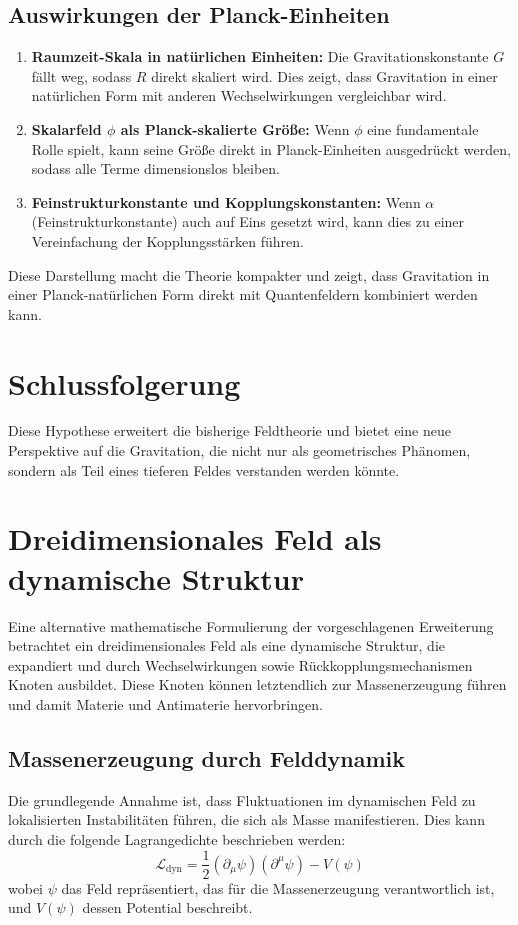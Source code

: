 \documentclass[a4paper,11pt]{article}
\begin{document}
	\subsection{Auswirkungen der Planck-Einheiten}
	\begin{enumerate}
		\item \textbf{Raumzeit-Skala in natürlichen Einheiten:} Die Gravitationskonstante $G$ fällt weg, sodass $R$ direkt skaliert wird. Dies zeigt, dass Gravitation in einer natürlichen Form mit anderen Wechselwirkungen vergleichbar wird.
		\item \textbf{Skalarfeld $\phi$ als Planck-skalierte Größe:} Wenn $\phi$ eine fundamentale Rolle spielt, kann seine Größe direkt in Planck-Einheiten ausgedrückt werden, sodass alle Terme dimensionslos bleiben.
		\item \textbf{Feinstrukturkonstante und Kopplungskonstanten:} Wenn $\alpha$ (Feinstrukturkonstante) auch auf Eins gesetzt wird, kann dies zu einer Vereinfachung der Kopplungsstärken führen.
	\end{enumerate}
	Diese Darstellung macht die Theorie kompakter und zeigt, dass Gravitation in einer Planck-natürlichen Form direkt mit Quantenfeldern kombiniert werden kann.
	
	\section{Schlussfolgerung}
	Diese Hypothese erweitert die bisherige Feldtheorie und bietet eine neue Perspektive auf die Gravitation, die nicht nur als geometrisches Phänomen, sondern als Teil eines tieferen Feldes verstanden werden könnte.
	\section{Dreidimensionales Feld als dynamische Struktur}
	Eine alternative mathematische Formulierung der vorgeschlagenen Erweiterung betrachtet ein dreidimensionales Feld als eine dynamische Struktur, die expandiert und durch Wechselwirkungen sowie Rückkopplungsmechanismen Knoten ausbildet. Diese Knoten können letztendlich zur Massenerzeugung führen und damit Materie und Antimaterie hervorbringen.
	
	\subsection{Massenerzeugung durch Felddynamik}
	Die grundlegende Annahme ist, dass Fluktuationen im dynamischen Feld zu lokalisierten Instabilitäten führen, die sich als Masse manifestieren. Dies kann durch die folgende Lagrangedichte beschrieben werden:
	\begin{equation}
		\mathcal{L}_{\text{dyn}} = \frac{1}{2} (\partial_\mu \psi)(\partial^\mu \psi) - V(\psi)
	\end{equation}
	wobei $\psi$ das Feld repräsentiert, das für die Massenerzeugung verantwortlich ist, und $V(\psi)$ dessen Potential beschreibt.
	
\end{document}
